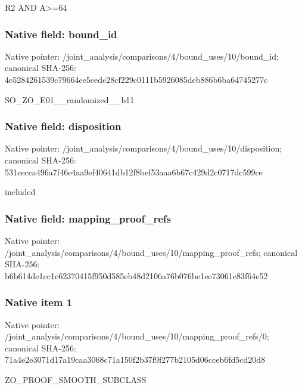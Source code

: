 \documentclass[10pt,a4paper]{article}
\begin{document}
\begingroup\raggedright\sloppy R2 AND A>=\allowbreak{}64\par\endgroup

\subsubsection{Native field: bound\_\allowbreak{}id}
Native pointer: /joint\_\allowbreak{}analysis/comparisons/4/bound\_\allowbreak{}uses/10/bound\_\allowbreak{}id; canonical SHA-256: 4e5284261539c79664ee5eede28cf229c0111b5926085deb886b6ba64745277c

\begingroup\raggedright\sloppy SO\_\allowbreak{}ZO\_\allowbreak{}E01\_\allowbreak{}\_\allowbreak{}randomized\_\allowbreak{}\_\allowbreak{}b11\par\endgroup

\subsubsection{Native field: disposition}
Native pointer: /joint\_\allowbreak{}analysis/comparisons/4/bound\_\allowbreak{}uses/10/disposition; canonical SHA-256: 531cecca496a7f46e4aa9ef40641db12f8bef53aaa6b67c429d2c0717dc599ce

\begingroup\raggedright\sloppy included\par\endgroup

\subsubsection{Native field: mapping\_\allowbreak{}proof\_\allowbreak{}refs}
Native pointer: /joint\_\allowbreak{}analysis/comparisons/4/bound\_\allowbreak{}uses/10/mapping\_\allowbreak{}proof\_\allowbreak{}refs; canonical SHA-256: b6b614de1cc1e62370415f950d585eb48d2106a76b076be1ee73061e83f64e52

\subsubsection{Native item 1}
Native pointer: /joint\_\allowbreak{}analysis/comparisons/4/bound\_\allowbreak{}uses/10/mapping\_\allowbreak{}proof\_\allowbreak{}refs/0; canonical SHA-256: 71a4e2e3071d17a19caa3068c71a150f2b37f9f277b2105d06cceb6fd5cd20d8

\begingroup\raggedright\sloppy ZO\_\allowbreak{}PROOF\_\allowbreak{}SMOOTH\_\allowbreak{}SUBCLASS\par\endgroup
\end{document}
